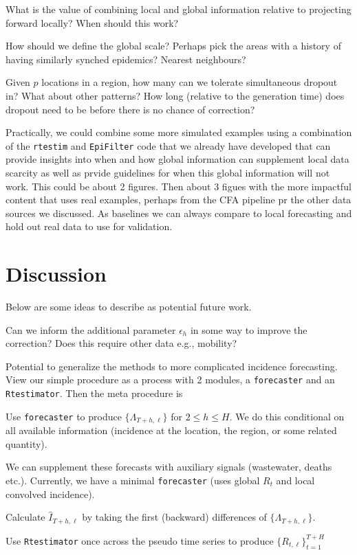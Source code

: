 \documentclass[12pt]{article}
\begin{document}
\bitem
\item What is the value of combining local and global information relative to
projecting forward locally? When should this work?
\item How should we define the global scale? Perhaps pick the areas with a
history of having similarly synched epidemics? Nearest neighbours?
\item Given $p$ locations in a region, how many can we tolerate simultaneous
dropout in? What about other patterns? How long (relative to the generation
time) does dropout need to be before there is no chance of correction?
\eitem

Practically, we could combine some more simulated examples using a combination
of the \texttt{rtestim} and \texttt{EpiFilter} code that we already have
developed that can provide insights into when and how global information can
supplement local data scarcity as well as prvide guidelines for when this global
information will not work. This could be about 2 figures. Then about 3 figues
with the more impactful content that uses real examples, perhaps from the CFA
pipeline pr the other data sources we discussed. As baselines we can always
compare to local forecasting and hold out real data to use for validation. 


\section*{Discussion}

Below are some ideas to describe as potential future work.

\bitem
\item Can we inform the additional parameter $\epsilon_h$ in some way to improve
the correction? Does this require other data e.g., mobility?

\item Potential to generalize the methods to more complicated incidence forecasting.
View our simple procedure as a process with 2 modules, a
\texttt{forecaster} and an \texttt{Rtestimator}. Then the meta procedure is

\benum
\item Use \texttt{forecaster} to produce $\{\Lambda_{T+h, \ell}\}$ for $2\leq h
\leq H$. We do this conditional on all available information (incidence at the
location, the region, or some related quantity). 
\item We can supplement these forecasts with auxiliary signals (wastewater,
deaths etc.). Currently, we have a minimal \texttt{forecaster} (uses global $R_t$
and local convolved incidence).
\item Calculate $\hat{I}_{T+h, \ell}$ by taking the first (backward) differences
of $\{\Lambda_{T+h, \ell}\}$.
\item Use \texttt{Rtestimator} once across the pseudo time series to produce
$\{R_{t, \ell}\}_{t=1}^{T+H}$
\eenum
\end{document}
